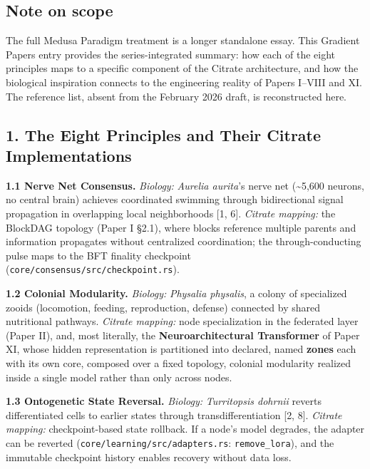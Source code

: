 \subsection{Note on scope}\label{note-on-scope}

The full Medusa Paradigm treatment is a longer standalone essay. This
Gradient Papers entry provides the series-integrated summary: how each
of the eight principles maps to a specific component of the Citrate
architecture, and how the biological inspiration connects to the
engineering reality of Papers I--VIII and XI. The reference list, absent
from the February 2026 draft, is reconstructed here.

\subsection{1. The Eight Principles and Their Citrate
Implementations}\label{the-eight-principles-and-their-citrate-implementations}

\textbf{1.1 Nerve Net Consensus.} \emph{Biology:} \emph{Aurelia
aurita}'s nerve net (\textasciitilde5,600 neurons, no central brain)
achieves coordinated swimming through bidirectional signal propagation
in overlapping local neighborhoods {[}1, 6{]}. \emph{Citrate mapping:}
the BlockDAG topology (Paper I §2.1), where blocks reference multiple
parents and information propagates without centralized coordination; the
through-conducting pulse maps to the BFT finality checkpoint
(\texttt{core/consensus/src/checkpoint.rs}).

\textbf{1.2 Colonial Modularity.} \emph{Biology:} \emph{Physalia
physalis}, a colony of specialized zooids (locomotion, feeding,
reproduction, defense) connected by shared nutritional pathways.
\emph{Citrate mapping:} node specialization in the federated layer
(Paper II), and, most literally, the \textbf{Neuroarchitectural
Transformer} of Paper XI, whose hidden representation is partitioned
into declared, named \textbf{zones} each with its own core, composed
over a fixed topology, colonial modularity realized inside a single
model rather than only across nodes.

\textbf{1.3 Ontogenetic State Reversal.} \emph{Biology:}
\emph{Turritopsis dohrnii} reverts differentiated cells to earlier
states through transdifferentiation {[}2, 8{]}. \emph{Citrate mapping:}
checkpoint-based state rollback. If a node's model degrades, the adapter
can be reverted (\texttt{core/learning/src/adapters.rs}:
\texttt{remove\_lora}), and the immutable checkpoint history enables
recovery without data loss.

